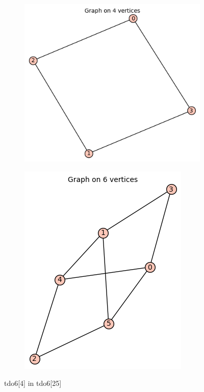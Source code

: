 \documentclass[12pt, a4paper]{article}
\begin{document}
\begin{center}
\begin{figure}[!htb]
\centering
\begin{subfigure}{0.5\textwidth}
  \centering
  \includegraphics[width=0.5\linewidth]{tdo6[4]}
\end{subfigure}%
\begin{subfigure}{0.5\textwidth}
  \centering
  \includegraphics[width=0.45\linewidth]{tdo6[25]}
\end{subfigure}
\caption{tdo6[4] in tdo6[25]}
\label{fig:test}
\end{figure}


\end{center}
\end{document}
